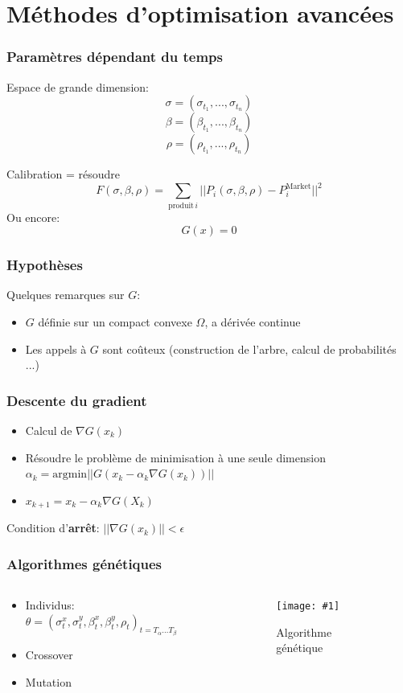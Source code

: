 \documentclass{beamer}
\newcommand{\IMG}[3]{
  \begin{figure}[H]
    \centering
    \texttt{[image: \#1]}%
    \caption{#2}
    \label{#1}
  \end{figure}
}
\begin{document}
\section{Méthodes d'optimisation avancées}
\begin{frame}
  \frametitle{Paramètres dépendant du temps}
  Espace de grande dimension:
  $$ \sigma = (\sigma_{t_1}, ..., \sigma_{t_n}) $$
  $$ \beta = (\beta_{t_1}, ..., \beta_{t_n}) $$
  $$ \rho = (\rho_{t_1}, ..., \rho_{t_n}) $$

  Calibration = résoudre
  $$F(\sigma, \beta, \rho) = \sum_{\text{produit} \, i} ||P_i(\sigma, \beta, \rho) - P_i^{\text{Market}} ||^2$$
  Ou encore:
  $$G(x) = 0$$
\end{frame}

\begin{frame}
  \frametitle{Hypothèses}
  Quelques remarques sur $G$:
  \begin{itemize}
  \item $G$ définie sur un compact convexe $\Omega$, a dérivée continue
  \item Les appels à $G$ sont coûteux (construction de l'arbre, calcul de probabilités ...)
  \end{itemize}
\end{frame}

\begin{frame}
  \frametitle{Descente du gradient}
  \begin{itemize}
  \item Calcul de $\nabla G(x_k)$
  \item Résoudre le problème de minimisation à une seule dimension
    $\alpha_k = \text{argmin} ||G\left(x_k - \alpha_k \nabla G (x_k) \right)||$
  \item $ x_{k+1} = x_k - \alpha_k \nabla G(X_k)$
  \end{itemize}
Condition d'\textbf{arrêt}: $||\nabla G(x_k)|| <  \epsilon$
\end{frame}

\begin{frame}
  \frametitle{Algorithmes génétiques}
  \begin{columns}
    \begin{column}{0.4\textwidth}
      \begin{itemize}
      \item Individus: $\theta = ( \sigma^x_t, \sigma^y_t, \beta^x_t, \beta^y_t, \rho_t)_{t = T_\alpha \dots T_\beta}$
      \item Crossover
      \item Mutation
      \end{itemize}
    \end{column}
    \begin{column}{0.5\textwidth}
      \IMG{img/gaalgo.png}{Algorithme génétique}{0.3}
    \end{column}
    \end{columns}
\end{frame}
\end{document}
